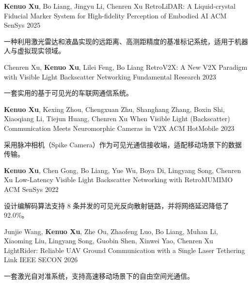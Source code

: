 \documentclass[11pt, a4paper]{awesome-cv-cn}
\begin{document}
\begin{cventries}
	
	\cventry
	{\textbf{Kenuo Xu}, Bo Liang, Jingyu Li, Chenren Xu}
	{RetroLiDAR: A Liquid-crystal Fiducial Marker System for High-fidelity Perception of Embodied AI}
	{ACM SenSys}
	{2025}
	{
		\begin{cvitems} %
			\item {一种利用激光雷达和液晶实现的远距离、高测距精度的基准标记系统，适用于机器人与虚拟现实领域。}
		\end{cvitems}
	}
	
	\cventry
	{Chenren Xu, \textbf{Kenuo Xu}, Lilei Feng, Bo Liang}
	{RetroV2X: A New V2X Paradigm with Visible Light Backscatter Networking}
	{Fundamental Research}
	{2023}
	{
		\begin{cvitems} %
			\item {一套实用的基于可见光的车联网通信系统。}
		\end{cvitems}
	}
	
	\cventry
	{\textbf{Kenuo Xu}, Kexing Zhou, Chengxuan Zhu, Shanghang Zhang, Boxin Shi, Xiaoqiang Li, Tiejun Huang, Chenren Xu}
	{When Visible Light (Backscatter) Communication Meets Neuromorphic Cameras in V2X}
	{ACM HotMobile}
	{2023}
	{
		\begin{cvitems} %
			\item {采用脉冲相机（Spike Camera）作为可见光通信接收端，适配移动场景下的数据传输。}
		\end{cvitems}
	}
	
	\cventry
	{\textbf{Kenuo Xu}, Chen Gong, Bo Liang, Yue Wu, Boya Di, Lingyang Song, Chenren Xu}
	{Low-Latency Visible Light Backscatter Networking with RetroMUMIMO}
	{ACM SenSys}
	{2022}
	{
		\begin{cvitems} %
			\item {设计编解码算法支持 8 条并发的可见光反向散射链路，并将网络延迟降低了 92.0\%。}
		\end{cvitems}
	}
	\cventry
	{Junjie Wang, \textbf{Kenuo Xu}, Zhe Ou, Zhaofeng Luo, Bo Liang, Muhan Li, Xiaoming Liu, Lingyang Song, Guobin Shen, Xinwei Yao, Chenren Xu}
	{LightRider: Reliable UAV Ground Communication with a Single Laser Tethering Link}
	{IEEE SECON}
	{2026}
	{
		\begin{cvitems} %
			\item {一套激光自对准系统，支持高速移动场景下的自由空间光通信。}
		\end{cvitems}
	}
	

\end{cventries}
\end{document}
